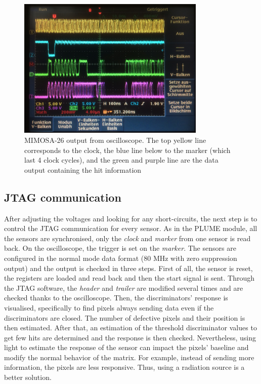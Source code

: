   \begin{figure}[h]
    \centering
    \includegraphics[width=0.8\textwidth]{Pictures/labTests/mi26_output}
    \caption{MIMOSA-26 output from oscilloscope. The top yellow line corresponds to the clock, the blue line below to the marker (which last 4 clock cycles), and the green and purple line are the data output containing the hit information}
    \label{fig:mi26Output}
  \end{figure}

  \subsection{JTAG communication}

  After adjusting the voltages and looking for any short-circuits, the next step is to control the \gls{JTAG} communication for every sensor.
  As in the \gls{PLUME} module, all the sensors are synchronised, only the \textit{clock} and \textit{marker} from one sensor is read back.
  On the oscilloscope, the trigger is set on the \textit{marker}.  
  The sensors are configured in the normal mode data format (80 MHz with zero suppression output) and the output is checked in three steps.
  First of all, the sensor is reset, the registers are loaded and read back and then the start signal is sent. 
  Through the \gls{JTAG} software, the \textit{header} and \textit{trailer} are modified several times and are checked thanks to the oscilloscope.
  Then, the discriminators' response is visualised, specifically to find pixels always sending data even if the discriminators are closed.
  The number of defective pixels and their position is then estimated.
  After that, an estimation of the threshold discriminator values to get few hits are determined and the response is then checked.
  Nevertheless, using light to estimate the response of the sensor can impact the pixels' baseline and modify the normal behavior of the matrix.
  For example, instead of sending more information, the pixels are less responsive.
  Thus, using a radiation source is a better solution.


